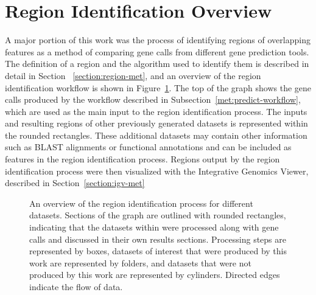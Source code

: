 \section{Region Identification Overview}
\label{section:region-overview}
A major portion of this work was the process of identifying regions of
overlapping features as a method of comparing gene calls from
different gene prediction tools. The definition of a region and the algorithm
used to identify them is described in detail in Section
~\ref{section:region-met}, and an overview of the region identification
workflow is shown in Figure~\ref{fig:region-overview}. The top of the
graph shows the gene calls produced by the workflow described in
Subsection~\ref{met:predict-workflow}, which are used as the main input
to the region identification process. The inputs and resulting regions of other previously
generated datasets is represented within the rounded rectangles. These additional datasets may contain other
information such as BLAST alignments or functional annotations and can
be included as features in the region identification process. Regions output by the region identification process
were then visualized with the Integrative Genomics Viewer, described
in Section~\ref{section:igv-met}

\begin{figure}
  \centering
  \caption{An overview of the region identification process for
    different datasets. Sections of the graph are outlined with
    rounded rectangles, indicating that the datasets within were processed
    along with gene calls and discussed in their own results
    sections. Processing steps are represented by boxes, datasets of
    interest that were produced by this work are represented by
    folders, and datasets that were not produced by this work are
    represented by cylinders. Directed edges indicate the flow of
    data.}
  \label{fig:region-overview}
\end{figure}


